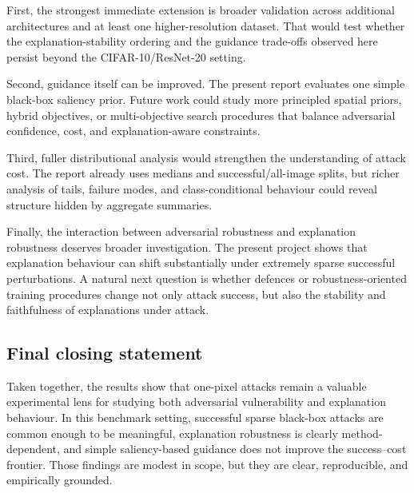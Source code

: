 First, the strongest immediate extension is broader validation across additional architectures and at least one higher-resolution dataset.
That would test whether the explanation-stability ordering and the guidance trade-offs observed here persist beyond the CIFAR-10/ResNet-20 setting.

Second, guidance itself can be improved.
The present report evaluates one simple black-box saliency prior.
Future work could study more principled spatial priors, hybrid objectives, or multi-objective search procedures that balance adversarial confidence, cost, and explanation-aware constraints.

Third, fuller distributional analysis would strengthen the understanding of attack cost.
The report already uses medians and successful/all-image splits, but richer analysis of tails, failure modes, and class-conditional behaviour could reveal structure hidden by aggregate summaries.

Finally, the interaction between adversarial robustness and explanation robustness deserves broader investigation.
The present project shows that explanation behaviour can shift substantially under extremely sparse successful perturbations.
A natural next question is whether defences or robustness-oriented training procedures change not only attack success, but also the stability and faithfulness of explanations under attack.

\subsection{Final closing statement}
Taken together, the results show that one-pixel attacks remain a valuable experimental lens for studying both adversarial vulnerability and explanation behaviour.
In this benchmark setting, successful sparse black-box attacks are common enough to be meaningful, explanation robustness is clearly method-dependent, and simple saliency-based guidance does not improve the success--cost frontier.
Those findings are modest in scope, but they are clear, reproducible, and empirically grounded.
